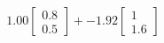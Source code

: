 \documentclass[preview]{standalone}
\begin{document}
\begin{align*}
1.00 \begin{bmatrix} 0.8 \\ 0.5 \end{bmatrix} + -1.92 \begin{bmatrix} 1 \\ 1.6 \end{bmatrix}
\end{align*}
\end{document}

